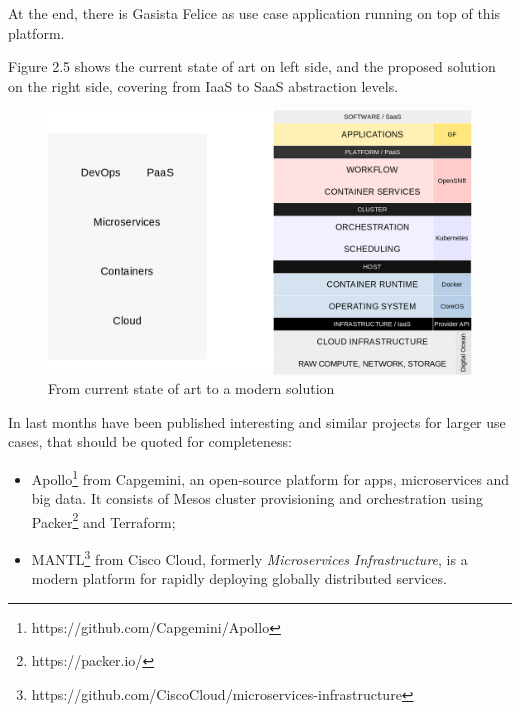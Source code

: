 At the end, there is Gasista Felice as use case application running on top of this platform.

Figure 2.5 shows the current state of art on left side, and the proposed solution on the right side, covering from IaaS to SaaS abstraction levels.

\begin{figure}[htbp]
\centering
\includegraphics{media/ch2-solution.png}
\caption{From current state of art to a modern solution}
\end{figure}

In last months have been published interesting and similar projects for larger use cases, that should be quoted for completeness:

\begin{itemize}
\item Apollo\footnote{https://github.com/Capgemini/Apollo} from Capgemini, an open-source platform for   apps, microservices and big data. It consists of Mesos cluster   provisioning and orchestration using Packer\footnote{https://packer.io/} and Terraform;
\item MANTL\footnote{https://github.com/CiscoCloud/microservices-infrastructure} from Cisco Cloud, formerly \textit{Microservices Infrastructure}, is a modern platform for rapidly   deploying globally distributed services.
\end{itemize}

